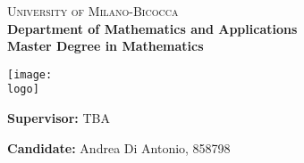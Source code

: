 \begin{titlepage}
    \thispagestyle{fancy}
    \fancyhf{}
	\fancyhead[C]{}

    \centering
    
    \begin{minipage}[t]{1\textwidth}
        \centering
        \huge{\textsc{University of Milano-Bicocca}} \\
        \large{\textbf{Department of Mathematics and Applications}} \\
        \large{\textbf{Master Degree in Mathematics}} \\
    \end{minipage}
    
    \vspace{10mm}
        
    \centering
    \begin{minipage}[t]{1\textwidth}
    \centering
    \texttt{[image: \\logo]}
    \end{minipage}
    
    \vspace{10mm}
    
    \begin{center}
        \huge{\textbf{\documenttitle}}
    \end{center}
    
    \vspace{10mm}

    \begin{flushleft}
        \noindent \large{\textbf{Supervisor:} TBA} \\
    \end{flushleft}
    
    \vspace{10mm}

    \begin{flushright}
        \large{ \textbf{Candidate:} Andrea Di Antonio, 858798}
    \end{flushright}
\end{titlepage}